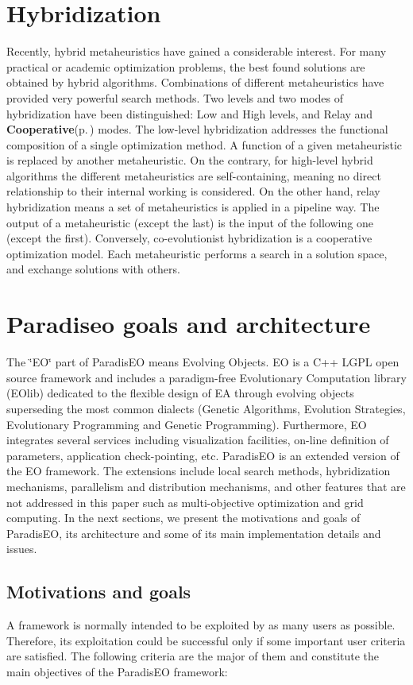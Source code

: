 \section{Hybridization}\label{main_hybridization}
Recently, hybrid metaheuristics have gained a considerable interest. For many practical or academic optimization problems, the best found solutions are obtained by hybrid algorithms. Combinations of different metaheuristics have provided very powerful search methods. Two levels and two modes of hybridization have been distinguished: Low and High levels, and Relay and {\bf Cooperative}{\rm (p.\,\pageref{class_cooperative})} modes. The low-level hybridization addresses the functional composition of a single optimization method. A function of a given metaheuristic is replaced by another metaheuristic. On the contrary, for high-level hybrid algorithms the different metaheuristics are self-containing, meaning no direct relationship to their internal working is considered. On the other hand, relay hybridization means a set of metaheuristics is applied in a pipeline way. The output of a metaheuristic (except the last) is the input of the following one (except the first). Conversely, co-evolutionist hybridization is a cooperative optimization model. Each metaheuristic performs a search in a solution space, and exchange solutions with others.\section{Paradiseo goals and architecture}\label{main_paradiseo_goals}
The \char`\"{}EO\char`\"{} part of Paradis\-EO means Evolving Objects. EO is a C++ LGPL open source framework and includes a paradigm-free Evolutionary Computation library (EOlib) dedicated to the flexible design of EA through evolving objects superseding the most common dialects (Genetic Algorithms, Evolution Strategies, Evolutionary Programming and Genetic Programming). Furthermore, EO integrates several services including visualization facilities, on-line definition of parameters, application check-pointing, etc. Paradis\-EO is an extended version of the EO framework. The extensions include local search methods, hybridization mechanisms, parallelism and distribution mechanisms, and other features that are not addressed in this paper such as multi-objective optimization and grid computing. In the next sections, we present the motivations and goals of Paradis\-EO, its architecture and some of its main implementation details and issues.\subsection{Motivations and goals}\label{main_motivation}
A framework is normally intended to be exploited by as many users as possible. Therefore, its exploitation could be successful only if some important user criteria are satisfied. The following criteria are the major of them and constitute the main objectives of the Paradis\-EO framework:

